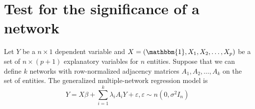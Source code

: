 \documentclass[times, doublespace]{auth}
\begin{document}
\section{Test for the significance of a network}
Let $Y$ be a $n \times 1$ dependent variable and $X = (\mathbbm{1}, X_{1},X_{2},\ldots,X_{p})$ be a set of $n \times (p+1)$ explanatory variables for $n$ entities. Suppose that we can define $k$ networks with row-normalized adjacency matrices $A_{1}, A_{2}, \ldots, A_{k}$ on the set of entities. The generalized multiple-network regression model is
\begin{equation}
\label{eqn: 3}
Y = X\beta + \sum\limits_{i=1}^{k} \lambda_{i}A_{i}Y + \varepsilon, \varepsilon \sim n(0,\sigma^{2}I_{n})
\end{equation}
\end{document}
